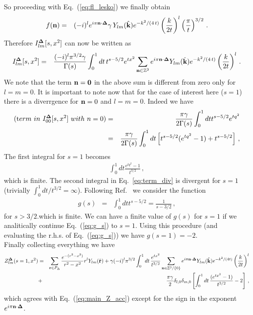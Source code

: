  So proceeding with Eq.~(\ref{eq:fl_lesko}) we finally obtain
	\begin{eqnarray}
	f({\bf n})&=&(-i)^le^{i\pi{\bf n}\cdot{\bf\Delta}}\gamma\, Y_{lm}(\hat{{\bf k}})e^{-k^2/(4\,t)}\left(\frac{k}{2t}\right)^l\left(\frac{\pi}{t}\right)^{3/2}\, .
	\end{eqnarray}
	Therefore $I^{\bf\Delta}_{lm}[s,x^2]$ can now be written as
	\begin{eqnarray}
		I^{\bf\Delta}_{lm}[s,x^2]&=&\frac{(-i)^l\pi^{3/2}\gamma}{\Gamma(s)}\int_0^1dt\,t^{s-5/2}e^{tx^2}\sum_{{\bf n}\in\mathbb{Z}^3}e^{i\pi{\bf n}\cdot{\bf \Delta}}Y_{lm}(\hat{\bf k})e^{-k^2/(4\,t)}\left(\frac{k}{2t}\right)^l\, .
	\end{eqnarray}
	We note that the term ${\bf n}={\bf 0}$ in the above sum is different from zero only for $l=m=0$.
	It is important to note now that for the case of interest here ($s=1$) there is a diverrgence for ${\bf n}=0$ and $l=m=0$.
	Indeed we have
	\begin{eqnarray}
	({\mbox term\,\, in\,\,}I^{\bf\Delta}_{00}[s,x^2] {\mbox \,\,with\,\,n=0 })&=&\frac{\pi\gamma}{2\Gamma(s)}\int_0^1dt t^{s-5/2}e^{tq^2}\nonumber\\
	&=&\frac{\pi\gamma}{2\Gamma(s)}\int_0^1dt\left[t^{s-5/2}(e^{tq^2}-1)+t^{s-5/2}\right]\, ,\label{eq:term_div}
	\end{eqnarray} 
	The first integral for $s=1$ becomes
	\begin{eqnarray}
	\int_0^1dt\frac{e^{tq^2}-1}{t^{3/2}}\, ,
	\end{eqnarray}
	which is finite. The second integral in Eq.~\ref{eq:term_div} is divergent for $s=1$ (trivially 
	$\int_0^1dt/t^{3/2}=\infty$). Following Ref.~\cite{Leskovec:2012gb} we consider the function
	\begin{eqnarray}
	g(s)&=&\int_0^1dtt^{s-5/2}=\frac{1}{s-3/2}\, ,\label{eq:g_s}
	\end{eqnarray}
	for $s>3/2$.which is finite. We can have a finite value of $g(s)$ for $s=1$ if we analitically continue  Eq.~(\ref{eq:g_s}) to $s=1$. Using this procedure (and evaluating the r.h.s. of Eq.~(\ref{eq:g_s})) we have $g(s=1)=-2$.\\
	Finally collecting everything we have
	\begin{eqnarray}
	Z^{\bf\Delta}_{lm}(s=1,x^2)&=&\sum_{{\bf r}\in P_\Delta}\frac{e^{-(r^2-x^2)}}{r^2-x^2}r^lY_{lm}(\hat{{\bf r}})+\gamma(-i)^l\pi^{3/2}\int_0^1dt\,\frac{e^{tx^2}}{t^{3/2}}\sum_{{\bf n}\in\mathbb{Z}^3/\{0\}}e^{i\pi{\bf n}\cdot{\bf \Delta}}Y_{lm}(\hat{\bf k})e^{-k^2/(4t)}\left(\frac{k}{2t}\right)^l\nonumber\\
	&+&\frac{\pi\gamma}{2}\delta_{l,0}\delta_{m,0}\left[\int_0^1 dt\,\frac{(e^{tx^2}-1)}{t^{3/2}}-2\right]\, ,
	\end{eqnarray}
	which agrees with Eq.~(\ref{eq:main_Z_acc}) {\color{red}except for the sign in the exponent 
	$e^{i\pi{\bf n}\cdot{\bf \Delta}} $}.
	 
